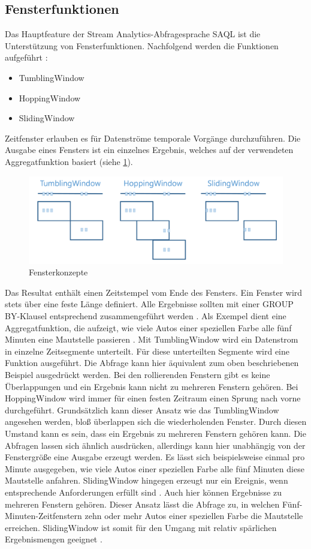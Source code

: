 \subsection{Fensterfunktionen}
Das Hauptfeature der Stream Analytics-Abfragesprache SAQL ist die Unterstützung von Fensterfunktionen. Nachfolgend werden die Funktionen aufgeführt \cite{Prosise.}: 
\begin{itemize} 
	\item TumblingWindow
	\item HoppingWindow
	\item SlidingWindow
\end{itemize}
Zeitfenster erlauben es für Datenströme temporale Vorgänge durchzuführen. Die Ausgabe eines Fensters ist ein einzelnes Ergebnis, welches auf der verwendeten Aggregatfunktion basiert (siehe \ref{fig:window_concepts}). 
\begin{figure}[H]
	\centering
	\includegraphics[width=1.0\linewidth]{images/fensterfunktionen}
	\caption{Fensterkonzepte \cite{Prosise.}} %
	\label{fig:window_concepts}
\end{figure} 
Das Resultat enthält einen Zeitstempel vom Ende des Fensters. Ein Fenster wird stets über eine feste Länge definiert. Alle Ergebnisse sollten mit einer GROUP BY-Klausel entsprechend zusammengeführt werden \cite{Azure.2017}. 
Als Exempel dient eine Aggregatfunktion, die aufzeigt, wie viele Autos einer speziellen Farbe alle fünf Minuten eine Mautstelle passieren \cite{Prosise.}. Mit TumblingWindow wird ein Datenstrom in einzelne Zeitsegmente unterteilt. Für diese unterteilten Segmente wird eine Funktion ausgeführt. Die Abfrage kann hier äquivalent zum oben beschriebenen Beispiel ausgedrückt werden. Bei den rollierenden Fenstern gibt es keine Überlappungen und ein Ergebnis kann nicht zu mehreren Fenstern gehören. Bei HoppingWindow wird immer für einen festen Zeitraum einen Sprung nach vorne durchgeführt. Grundsätzlich kann dieser Ansatz wie das TumblingWindow angesehen werden, bloß überlappen sich die wiederholenden Fenster. Durch diesen Umstand kann es sein, dass ein Ergebnis zu mehreren Fenstern gehören kann. Die Abfragen lassen sich ähnlich ausdrücken, allerdings kann hier unabhängig von der Fenstergröße eine Ausgabe erzeugt werden. Es lässt sich beispielsweise einmal pro Minute ausgegeben, wie viele Autos einer speziellen Farbe alle fünf Minuten diese Mautstelle anfahren. SlidingWindow hingegen erzeugt nur ein Ereignis, wenn entsprechende Anforderungen erfüllt sind \cite{Azure.2017}. Auch hier können Ergebnisse zu mehreren Fenstern gehören. Dieser Ansatz lässt die Abfrage zu, in welchen Fünf-Minuten-Zeitfenstern zehn oder mehr Autos einer speziellen Farbe die Mautstelle erreichen. SlidingWindow ist somit für den Umgang mit relativ spärlichen Ergebnismengen geeignet \cite{Prosise.}.

 